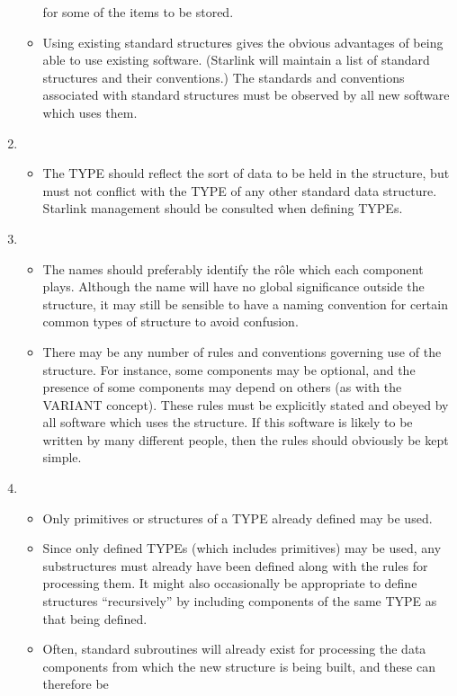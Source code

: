 \documentclass[twoside,11pt,nolof,noabs]{starlink}
\begin{document}
\begin{enumerate}
\begin{itemize}
for some of the items to be stored.
\item
Using existing standard structures gives the obvious advantages of being
able to use existing software.  (Starlink will maintain a list of
standard structures and their conventions.)  The standards and
conventions associated with standard structures must be observed by all
new software which uses them.
\end{itemize}
\html{\label{se:expnote4}}
\item
\begin{itemize}
\item
The TYPE should reflect the sort of data to be held in the structure, but
must not conflict with the TYPE of any other standard data structure.
Starlink management should be consulted when defining TYPEs.
\end{itemize}
\html{\label{se:expnote5}}
\item
\begin{itemize}
\item
The names should preferably identify the r\^{o}le which each component
plays.  Although the name will have no global significance outside the
structure, it may still be sensible to have a naming convention for
certain common types of structure to avoid confusion.
\item
There may be any number of rules and conventions governing use of the
structure.  For instance, some components may be optional, and the
presence of some components may depend on others (as with the VARIANT
concept). These rules must be explicitly stated and obeyed by all
software which uses the structure.  If this software is likely to be
written by many different people, then the rules should obviously be
kept simple.
\end{itemize}
\html{\label{se:expnote6}}
\item
\begin{itemize}
\item
Only primitives or structures of a TYPE already defined may be used.
\item
Since only defined TYPEs (which includes primitives) may be used, any
substructures must already have been defined along with the rules for
processing them.  It  might also occasionally be appropriate to
define structures ``recursively'' by including components of the same
TYPE as that being defined.
\item
Often, standard subroutines will already exist for
processing the data components
from which the new structure is being built, and these can therefore be

\end{itemize}
\end{enumerate}
\end{document}
